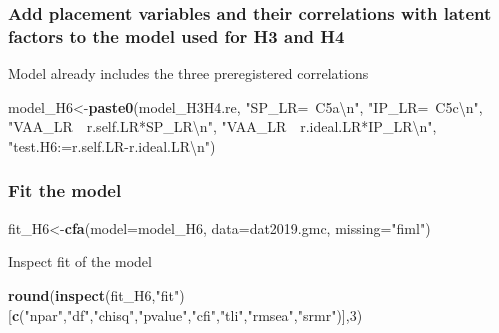 \documentclass[
]{article}
\newenvironment{Shaded}{\begin{snugshade}}{\end{snugshade}}
\newcommand{\CharTok}[1]{\textcolor[rgb]{0.31,0.60,0.02}{#1}}
\newcommand{\DataTypeTok}[1]{\textcolor[rgb]{0.13,0.29,0.53}{#1}}
\newcommand{\DecValTok}[1]{\textcolor[rgb]{0.00,0.00,0.81}{#1}}
\newcommand{\KeywordTok}[1]{\textcolor[rgb]{0.13,0.29,0.53}{\textbf{#1}}}
\newcommand{\NormalTok}[1]{#1}
\newcommand{\StringTok}[1]{\textcolor[rgb]{0.31,0.60,0.02}{#1}}
\begin{document}
\hypertarget{add-placement-variables-and-their-correlations-with-latent-factors-to-the-model-used-for-h3-and-h4}{%
\subsubsection{Add placement variables and their correlations with
latent factors to the model used for H3 and
H4}\label{add-placement-variables-and-their-correlations-with-latent-factors-to-the-model-used-for-h3-and-h4}}

Model already includes the three preregistered correlations

\begin{Shaded}
\begin{Highlighting}[]
\NormalTok{model_H6<-}\KeywordTok{paste0}\NormalTok{(model_H3H4.re,}
                 \StringTok{"SP_LR=~C5a}\CharTok{\textbackslash{}n}\StringTok{"}\NormalTok{,}
                 \StringTok{"IP_LR=~C5c}\CharTok{\textbackslash{}n}\StringTok{"}\NormalTok{,}
                 \StringTok{"VAA_LR~~r.self.LR*SP_LR}\CharTok{\textbackslash{}n}\StringTok{"}\NormalTok{,}
                 \StringTok{"VAA_LR~~r.ideal.LR*IP_LR}\CharTok{\textbackslash{}n}\StringTok{"}\NormalTok{,}
                 \StringTok{"test.H6:=r.self.LR-r.ideal.LR}\CharTok{\textbackslash{}n}\StringTok{"}\NormalTok{)}
\end{Highlighting}
\end{Shaded}

\hypertarget{fit-the-model-2}{%
\subsubsection{Fit the model}\label{fit-the-model-2}}

\begin{Shaded}
\begin{Highlighting}[]
\NormalTok{fit_H6<-}\KeywordTok{cfa}\NormalTok{(}\DataTypeTok{model=}\NormalTok{model_H6,}
            \DataTypeTok{data=}\NormalTok{dat2019.gmc,}
            \DataTypeTok{missing=}\StringTok{"fiml"}\NormalTok{)}
\end{Highlighting}
\end{Shaded}

Inspect fit of the model

\begin{Shaded}
\begin{Highlighting}[]
\KeywordTok{round}\NormalTok{(}\KeywordTok{inspect}\NormalTok{(fit_H6,}\StringTok{"fit"}\NormalTok{)}
\NormalTok{      [}\KeywordTok{c}\NormalTok{(}\StringTok{"npar"}\NormalTok{,}\StringTok{"df"}\NormalTok{,}\StringTok{"chisq"}\NormalTok{,}\StringTok{"pvalue"}\NormalTok{,}\StringTok{"cfi"}\NormalTok{,}\StringTok{"tli"}\NormalTok{,}\StringTok{"rmsea"}\NormalTok{,}\StringTok{"srmr"}\NormalTok{)],}\DecValTok{3}\NormalTok{)}
\end{Highlighting}
\end{Shaded}
\end{document}
